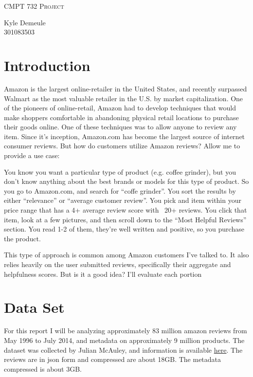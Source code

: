 \documentclass[a4paper,10pt]{article}
\begin{document}
\begin{titlepage}
    \centering
    {\scshape\LARGE CMPT 732 Project\par}
    \vspace{1cm}
    {\Large Kyle Demeule \\ 301083503\par}
\end{titlepage}

\section*{Introduction}
Amazon is the largest online-retailer in the United States, and recently surpassed Walmart as the most valuable retailer in the U.S. by market capitalization. One of the pioneers of online-retail, Amazon had to develop techniques that would make shoppers comfortable in abandoning physical retail locations to purchase their goods online. One of these techniques was to allow anyone to review any item. Since it's inception, Amazon.com has become the largest source of internet consumer reviews. But how do customers utilize Amazon reviews? Allow me to provide a use case:

You know you want a particular type of product (e.g. coffee grinder), but you don't know anything about the best brands or models for this type of product. So you go to Amazon.com, and search for \enquote{coffe grinder}. You sort the results by either \enquote{relevance} or \enquote{average customer review}. You pick and item within your price range that has a 4+ average review score with ~20+ reviews. You click that item, look at a few pictures, and then scroll down to the \enquote{Most Helpful Reviews} section. You read 1-2 of them, they're well written and positive, so you purchase the product.

This type of approach is common among Amazon customers I've talked to. It also relies heavily on the user submitted reviews, specifically their aggregate and helpfulness scores. But is it a good idea? I'll evaluate each portion 

\section*{Data Set}
For this report I will be analyzing approximately 83 million amazon reviews from May 1996 to July 2014, and metadata on approximately 9 million products. The dataset was collected by Julian McAuley, and information is available \href{http://jmcauley.ucsd.edu/data/amazon/}{here}. The reviews are in json form and compressed are about 18GB. The metadata compressed is about 3GB.
\end{document}
